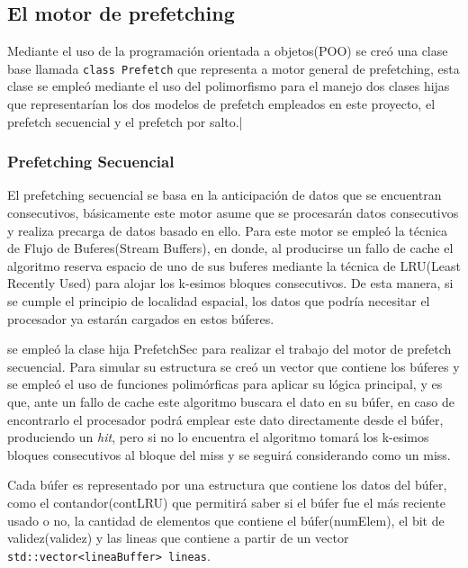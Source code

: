 \documentclass[12pt, a4paper]{article}
\begin{document}
\subsection{El motor de prefetching}
Mediante el uso de la programación orientada a objetos(POO) se creó una clase base llamada \lstinline|class Prefetch| que representa a motor general de prefetching, esta clase se empleó mediante el uso del polimorfismo para el manejo dos clases hijas que representarían los dos modelos de prefetch empleados en este proyecto, el prefetch secuencial y el prefetch por salto.|

\subsubsection{Prefetching Secuencial}
El prefetching secuencial se basa en la anticipación de datos que se encuentran consecutivos, básicamente este motor asume que se procesarán datos consecutivos y realiza precarga de datos basado en ello. Para este motor se empleó la técnica de Flujo de Buferes(Stream Buffers), en donde, al producirse un fallo de cache el algoritmo reserva espacio de uno de sus buferes mediante la técnica de LRU(Least Recently Used) para alojar los k-esimos bloques consecutivos. De esta manera, si se cumple el principio de localidad espacial, los datos que podría necesitar el procesador ya estarán cargados en estos búferes.

se empleó la clase hija PrefetchSec para realizar el trabajo del motor de prefetch secuencial. Para simular su estructura se creó un vector que contiene los búferes y se empleó el uso de funciones polimórficas para aplicar su lógica principal, y es que, ante un fallo de cache este algoritmo buscara el dato en su búfer, en caso de encontrarlo el procesador podrá emplear este dato directamente desde el búfer, produciendo un \textit{hit}, pero si no lo encuentra el algoritmo tomará los k-esimos bloques consecutivos al bloque del miss y se seguirá considerando como un miss.

Cada búfer es representado por una estructura que contiene los datos del búfer, como el contandor(contLRU) que permitirá saber si el búfer fue el más reciente usado o no, la cantidad de elementos que contiene el búfer(numElem), el bit de validez(validez) y las lineas que contiene a partir de un vector \lstinline|std::vector<lineaBuffer> lineas|.
\end{document}
